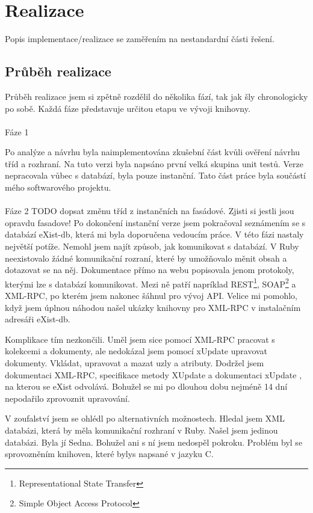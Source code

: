 \chapter{Realizace}
Popis implementace/realizace se zaměřením na nestandardní části řešení.

\section{Průběh realizace}
Průběh realizace jsem si zpětně rozdělil do několika fází, tak jak šly chronologicky po sobě. Každá fáze představuje určitou etapu ve vývoji knihovny.
\\
\\
\noindent Fáze 1

\noindent Po analýze a návrhu byla naimplementována zkušební část kvůli ověření návrhu tříd a rozhraní. Na tuto verzi byla napsáno první velká skupina unit testů. Verze nepracovala vůbec s databází, byla pouze instanční. Tato část práce byla součástí mého softwarového projektu.
\\
\\
\noindent Fáze 2
TODO dopsat změnu tříd z instančních na fasádové. Zjisti si jestli jsou opravdu fasadove!
\noindent Po dokončení instanční verze jsem pokračoval seznámením se s databází eXist-db, která mi byla doporučena vedoucím práce. V této fázi nastaly největší potíže. Nemohl jsem najít způsob, jak komunikovat s databází. V Ruby neexistovalo žádné komunikační rozraní, které by umožňovalo měnit obsah a dotazovat se na něj. Dokumentace přímo na webu \cite{exist:exist} popisovala jenom protokoly, kterými lze s databází komunikovat. Mezi ně patří napríklad REST\footnote[1]{Representational State Transfer}, SOAP\footnote[2]{Simple Object Access Protocol} a XML-RPC, po kterém jsem nakonec šáhnul pro vývoj API. Velice mi pomohlo, když jsem úplnou náhodou našel ukázky knihovny pro XML-RPC v instalačním adresáři eXist-db.

Komplikace tím nezkončili. Uměl jsem sice pomocí XML-RPC pracovat s kolekcemi a dokumenty, ale nedokázal jsem pomocí xUpdate upravovat dokumenty. Vkládat, upravovat a mazat uzly a atributy. Dodržel jsem dokumentaci XML-RPC, specifikace metody XUpdate\cite{exist:xmlrpcxupdate} a dokumentaci xUpdate \cite{xupdate}, na kterou se eXist odvolává. Bohužel se mi po dlouhou dobu nejméně 14 dní nepodařilo zprovoznit upravování. 

V zoufalství jsem se ohlédl po alternativních možnostech. Hledal jsem XML databázi, která by měla komunikační rozhraní v Ruby. Našel jsem jedinou databázi. Byla jí Sedna. Bohužel ani s ní jsem nedospěl pokroku. Problém byl se sprovozněním knihoven, které bylys napsané v jazyku C.

